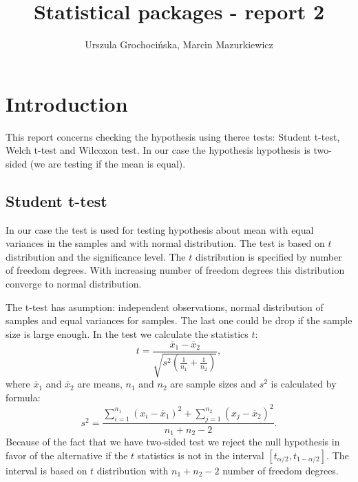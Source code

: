 \documentclass{article}
\begin{document}
  
  


\title{Statistical packages - report 2}
\author{Urszula Grochocińska, Marcin Mazurkiewicz}
\maketitle
\tableofcontents 


  \section{Introduction}
This report concerns checking the hypothesis using theree tests: Student t-test, Welch t-test and Wilcoxon test. In our case the hypothesis hypothesis is two-sided (we are testing if the mean is equal).
  \subsection{Student t-test}
In our case the test is used for testing hypothesis about mean with equal variances in the samples and with normal distribution. The test is based on $t$ distribution and the significance level. The $t$ distribution is specified by number of freedom degrees. With increasing number of freedom degrees this distribution converge to normal distribution.

  The t-test has asumption: independent observations, normal distribution of samples and equal variances for samples. The last one could be drop if the sample size is large enough.
  In the test we calculate the statistics $t$:
  \begin{equation}
  t=\frac{\overline{x}_1-\overline{x}_2}{\sqrt{s^2\left(\frac{1}{n_1}+\frac{1}{n_2}\right)}},
  \end{equation}
where $\overline{x}_1$ and $\overline{x}_2$ are means, $n_1$ and $n_2$ are sample sizes and $s^2$ is calculated by formula:
  \begin{equation}
    s^2=\frac{\sum_{i=1}^{n_1}(x_i-\overline{x}_1)^2+\sum_{j=1}^{n_2}(x_j-\overline{x}_2)^2}{n_1+n_2-2}.
  \end{equation}
Because of the fact that we have two-sided test we reject the null hypothesis in favor of the alternative if the $t$ statistics is not in the interval $[t_{\alpha/2}, t_{1-\alpha/2}]$. The interval is based on $t$ distribution with $n_1+n_2-2$ number of freedom degrees.
\end{document}
